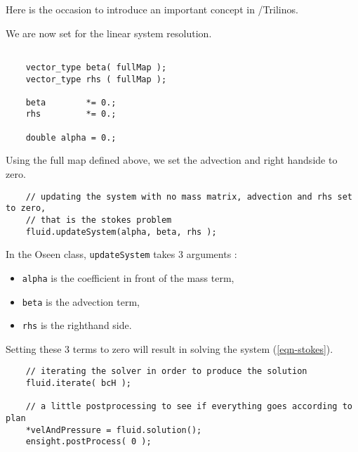 Here is the occasion to introduce an important concept in \lifev/Trilinos.

We are now set for the linear system resolution.


\begin{verbatim}

    vector_type beta( fullMap );
    vector_type rhs ( fullMap );

    beta        *= 0.;
    rhs         *= 0.;

    double alpha = 0.;
\end{verbatim}

Using the full map defined above, we set the advection and right handside to zero.


\begin{verbatim}
    // updating the system with no mass matrix, advection and rhs set to zero,
    // that is the stokes problem
    fluid.updateSystem(alpha, beta, rhs );
\end{verbatim}

In the Oseen class, \verb|updateSystem| takes 3 arguments :
\begin{itemize}
\item \verb|alpha| is the coefficient in front of the mass term,
\item \verb|beta| is the advection term,
\item \verb|rhs| is the righthand side.
\end{itemize}
Setting these 3 terms to zero will result in solving the system (\ref{eqn-stokes}).


\begin{verbatim}
    // iterating the solver in order to produce the solution
    fluid.iterate( bcH );

    // a little postprocessing to see if everything goes according to plan
    *velAndPressure = fluid.solution();
    ensight.postProcess( 0 );

\end{verbatim}


%
%
